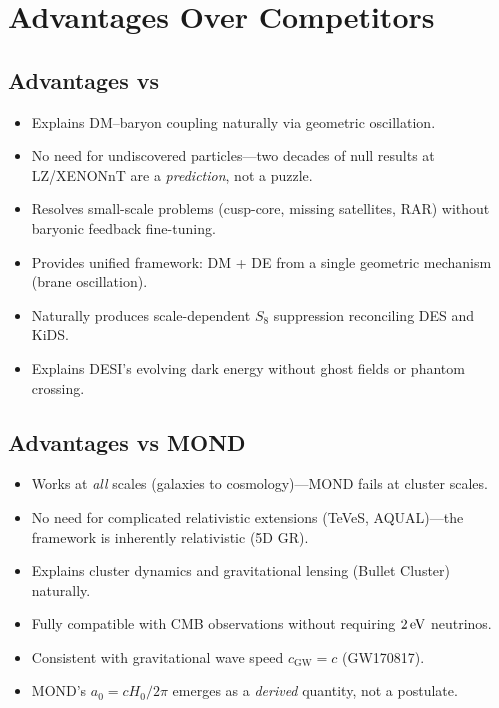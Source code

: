 \section{Advantages Over Competitors}
\label{sec:advantages}

\subsection{Advantages vs \LCDM}

\begin{itemize}
  \item Explains DM--baryon coupling naturally via geometric oscillation.
  \item No need for undiscovered particles---two decades of null results at LZ/XENONnT are a \emph{prediction}, not a puzzle.
  \item Resolves small-scale problems (cusp-core, missing satellites, RAR) without baryonic feedback fine-tuning.
  \item Provides unified framework: DM + DE from a single geometric mechanism (brane oscillation).
  \item Naturally produces scale-dependent $S_8$ suppression reconciling DES and KiDS.
  \item Explains DESI's evolving dark energy without ghost fields or phantom crossing.
\end{itemize}

\subsection{Advantages vs MOND}

\begin{itemize}
  \item Works at \emph{all} scales (galaxies to cosmology)---MOND fails at cluster scales.
  \item No need for complicated relativistic extensions (TeVeS, AQUAL)---the framework is inherently relativistic (5D GR).
  \item Explains cluster dynamics and gravitational lensing (Bullet Cluster) naturally.
  \item Fully compatible with CMB observations without requiring $2\,\text{eV}$ neutrinos.
  \item Consistent with gravitational wave speed $c_\text{GW} = c$ (GW170817).
  \item MOND's $a_0 = cH_0/2\pi$ emerges as a \emph{derived} quantity, not a postulate.
\end{itemize}

